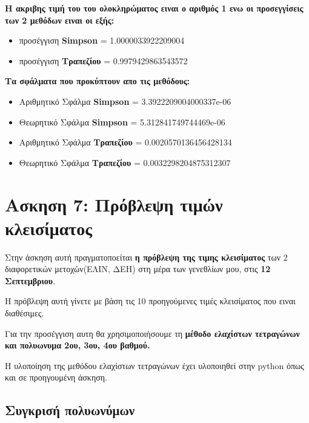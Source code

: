 \documentclass[18pt]{article}
\begin{document}
\vspace{0.5cm}

\textbf{Η ακριβης τιμή του του ολοκληρώματος ειναι ο αριθμός 1 ενω οι προσεγγίσεις των 2 μεθόδων ειναι οι εξής:}

\begin{itemize}
\item προσέγγιση \textbf{Simpson} =  1.0000033922209004
\item προσέγγιση \textbf{Tραπεζίου} = 0.9979429863543572
\end{itemize}

\vspace{0.5cm}

\textbf{Τα σφάλματα που προκύπτουν απο τις μεθόδους:}

\begin{itemize}
\item Αριθμητικό Σφάλμα \textbf{Simpson} =  3.3922209004000337e-06
\item Θεωρητικό Σφάλμα \textbf{Simpson} =  5.312841749744469e-06
\vspace{0.2cm}
\item Αριθμητικό Σφάλμα \textbf{Τραπεζίου} =  0.0020570136456428134
\item Θεωρητικό Σφάλμα \textbf{Τραπεζίου} =  0.0032298204875312307
\end{itemize}

\newpage
\section*{Ασκηση 7: Πρόβλεψη τιμών κλεισίματος}

Στην άσκηση αυτή πραγματοποείται \textbf{η πρόβλεψη της τιμης κλεισίματος} των 2 διαφορετικών μετοχών(ΕΛΙΝ, ΔΕΗ) στη μέρα των γενεθλίων μου, στις \textbf{12 Σεπτεμβριου}.

Η πρόβλεψη αυτή γίνετε με βάση τις 10 προηγούμενες τιμές κλεισίματος που ειναι διαθέσιμες.

Για την προσέγγιση αυτη θα χρησιμοποιήσουμε τη \textbf{μέθοδο ελαχίστων τετραγώνων και πολυωνυμα 2ου, 3ου, 4ου βαθμού.}

Η υλοποίηση της μεθόδου ελαχίστων τετραγώνων έχει υλοποιηθεί στην python όπως και σε προηγουμένη άσκηση.

\vspace{0.5cm}

\subsection*{Συγκρισή πολυωνύμων}
\end{document}
